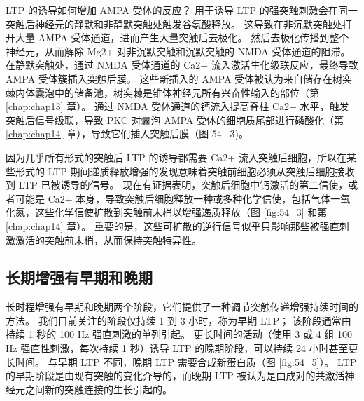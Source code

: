 LTP 的诱导如何增加 AMPA 受体的反应？
用于诱导 LTP 的强突触刺激会在同一突触后神经元的静默和非静默突触处触发谷氨酸释放。
这导致在非沉默突触处打开大量 AMPA 受体通道，进而产生大量突触后去极化。
然后去极化传播到整个神经元，从而解除 Mg2+ 对非沉默突触和沉默突触的 NMDA 受体通道的阻滞。
在静默突触处，通过 NMDA 受体通道的 Ca2+ 流入激活生化级联反应，最终导致 AMPA 受体簇插入突触后膜。
这些新插入的 AMPA 受体被认为来自储存在树突棘内体囊泡中的储备池，树突棘是锥体神经元所有兴奋性输入的部位（第 \ref{chap:chap13} 章）。
通过 NMDA 受体通道的钙流入提高脊柱 Ca2+ 水平，触发突触后信号级联，导致 PKC 对囊泡 AMPA 受体的细胞质尾部进行磷酸化（第 \ref{chap:chap14} 章），导致它们插入突触后膜（图 54– 3)。


因为几乎所有形式的突触后 LTP 的诱导都需要 Ca2+ 流入突触后细胞，所以在某些形式的 LTP 期间递质释放增强的发现意味着突触前细胞必须从突触后细胞接收到 LTP 已被诱导的信号。
现在有证据表明，突触后细胞中钙激活的第二信使，或者可能是 Ca2+ 本身，导致突触后细胞释放一种或多种化学信使，包括气体一氧化氮，这些化学信使扩散到突触前末梢以增强递质释放（图 \ref{fig:54_3} 和第 \ref{chap:chap14} 章）。
重要的是，这些可扩散的逆行信号似乎只影响那些被强直刺激激活的突触前末梢，从而保持突触特异性。



\subsection{长期增强有早期和晚期}

长时程增强有早期和晚期两个阶段，它们提供了一种调节突触传递增强持续时间的方法。
我们目前关注的阶段仅持续 1 到 3 小时，称为早期 LTP；
该阶段通常由持续 1 秒的 100 Hz 强直刺激的单列引起。
更长时间的活动（使用 3 或 4 组 100 Hz 强直性刺激，每次持续 1 秒）诱导 LTP 的晚期阶段，可以持续 24 小时甚至更长时间。
与早期 LTP 不同，晚期 LTP 需要合成新蛋白质（图 \ref{fig:54_5}）。
LTP 的早期阶段是由现有突触的变化介导的，而晚期 LTP 被认为是由成对的共激活神经元之间新的突触连接的生长引起的。


